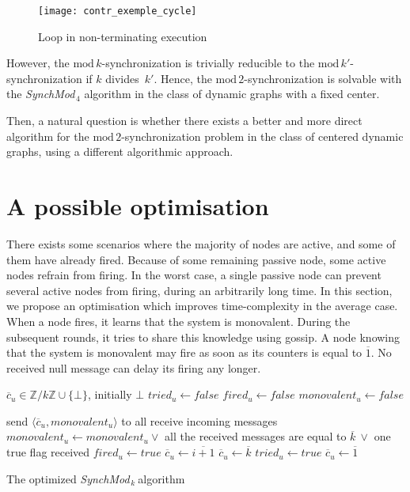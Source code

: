 \documentclass{article}
\newcommand{\SM}{{\em SynchMod}$_{\,k}\ $}
\begin{document}
\begin{figure}[h]
	\centering
	\texttt{[image: contr\_exemple\_cycle]}
	\caption{Loop in non-terminating execution}
\end{figure}

However,  the $\mathrm{mod}\,k$-synchronization is trivially reducible to the $\mathrm{mod}\,k'$-synchronization 
	if $k$ divides~$k'$.
Hence, the $\mathrm{mod}\,2$-synchronization is solvable with the {\em SynchMod}$_{\,4}$ algorithm 
	in the class of dynamic  graphs with a fixed center.

Then, a  natural question is  whether there exists a better and more direct algorithm for the $\mathrm{mod}\,2$-synchronization
problem in the class of  centered dynamic graphs, using a  different algorithmic approach. 

\section{A possible optimisation}

There exists some scenarios where the majority of nodes are active, and some of them have already fired. Because of some remaining passive node, some active nodes refrain from firing.
In the worst case, a single passive node can prevent several active nodes from firing, during an arbitrarily long time.
In this section, we propose an optimisation which improves time-complexity in the average case.
When a node fires, it learns that the system is monovalent. During the subsequent rounds, it tries to share this knowledge using gossip.
A node knowing that the system is monovalent may fire as soon as its counters is equal to $\overline{1}$. No received null message can delay its firing any longer.

\begin{algorithm}[htb]
\begin{distribalgo}[1]
\BLANK {}
	\STATE $\overline{c}_u \in \mathds{Z}/k\mathds{Z} \cup \{\bot\}$, initially $\bot$
	\STATE $tried_u \leftarrow false$
	\STATE $fired_u \leftarrow false$
	\STATE $monovalent_u \leftarrow false$

\ENDINDENT \BLANK

	\STATE send $\langle \overline{c}_u, monovalent_u \rangle$ to all 
	\STATE receive incoming messages
	\STATE $monovalent_u \leftarrow monovalent_u \vee$ all the received messages are equal to $\overline{k}~\vee$ one true flag received \label{line:detect-monovalent}
		\STATE $fired_u \leftarrow true$
	\ENDIF
		\STATE $\overline{c}_u \leftarrow \overline{i+1} $
	\ELSE {}
		\STATE $\overline{c}_u \leftarrow \overline{k} $
		\STATE $tried_u \leftarrow true$
	\ELSE
		\STATE $\overline{c}_u \leftarrow \overline{1}$
	\ENDIF
	\ENDIF
\ENDINDENT 

\caption{The optimized \SM algorithm} 
\end{distribalgo}

\end{algorithm}
\end{document}
